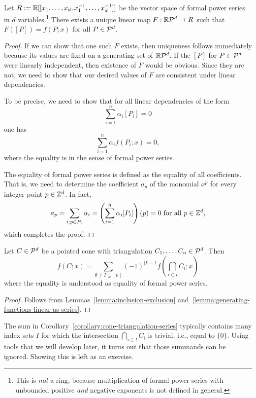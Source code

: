 \begin{lemma}
  \label{lemma:generating-functions-linear-as-series}
  Let $R := \mathbb{R}[[x_1,\ldots,x_d,x_1^{-1},\ldots,x_d^{-1}]]$ be the vector space of formal power series in $d$ variables.\footnote{%
  This is \emph{not} a ring, because multiplication of formal power series with unbounded positive \emph{and} negative exponents is not defined in general.}
  There exists a unique linear map $F: \mathbb{R} \mathcal{P}^d \to R$
  such that $F([P]) = f(P;x)$ for all $P \in \mathcal{P}^d$.
\end{lemma}
\begin{proof}
  If we can show that one such $F$ exists,
  then uniqueness follows immediately because its values are fixed on a generating set of $\mathbb{R}\mathcal{P}^d$.
  If the $[P]$ for $P \in \mathcal{P}^d$ were linearly independent,
  then existence of $F$ would be obvious.
  Since they are not, we need to show that our desired values of $F$ are consistent under linear dependencies.

  To be precise, we need to show that for all linear dependencies of the form
  \[
    \sum_{i=1}^n \alpha_i [P_i] = 0
  \]
  one has
  \[
    \sum_{i=1}^n \alpha_i f(P_i; x) = 0,
  \]
  where the equality is in the sense of formal power series.

  The equality of formal power series is defined as the equality of all coefficients.
  That is,
  we need to determine the coefficient $a_p$ of the monomial $x^p$
  for every integer point $p \in \mathbb{Z}^d$.
  In fact,
  \[
    a_p = \sum_{i: p \in P_i} \alpha_i = \left(\sum_{i=1}^n \alpha_i [P_i] \right)(p) = 0 \text{ for all } p \in \mathbb{Z}^d,
  \]
  which completes the proof.
\end{proof}

\begin{corollary}
  \label{corollary:cone-triangulation-series}
  Let $C \in \mathcal{P}^d$ be a pointed cone with triangulation $C_1, \ldots, C_n \in \mathcal{P}^d$.
  Then
  \[
    f(C;x) = \sum_{\emptyset \neq I \subseteq [n]} (-1)^{|I| - 1} f(\bigcap_{i \in I} C_i; x)
  \]
  where the equality is understood as equality of formal power series.
\end{corollary}
\begin{proof}
  Follows from Lemmas~\ref{lemma:inclusion-exclusion} and~\ref{lemma:generating-functions-linear-as-series}.
\end{proof}

The sum in Corollary~\ref{corollary:cone-triangulation-series} typically contains
many index sets $I$ for which the intersection $\bigcap_{i \in I} C_i$ is trivial,
i.e., equal to $\{ 0 \}$.
Using tools that we will develop later, it turns out that those summands can be ignored.
Showing this is left as an exercise.

